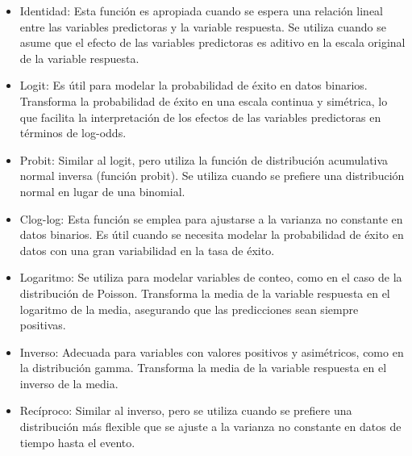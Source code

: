 \documentclass[
  11pt,
  bookmarksnumbered]{article}
\begin{document}
\begin{itemize}
\item
  Identidad: Esta función es apropiada cuando se espera una relación lineal entre las variables predictoras y la variable respuesta.
  Se utiliza cuando se asume que el efecto de las variables predictoras es aditivo en la escala original de la variable respuesta.
\item
  Logit: Es útil para modelar la probabilidad de éxito en datos binarios.
  Transforma la probabilidad de éxito en una escala continua y simétrica, lo que facilita la interpretación de los efectos de las variables predictoras en términos de log-odds.
\item
  Probit: Similar al logit, pero utiliza la función de distribución acumulativa normal inversa (función probit).
  Se utiliza cuando se prefiere una distribución normal en lugar de una binomial.
\item
  Clog-log: Esta función se emplea para ajustarse a la varianza no constante en datos binarios.
  Es útil cuando se necesita modelar la probabilidad de éxito en datos con una gran variabilidad en la tasa de éxito.
\item
  Logaritmo: Se utiliza para modelar variables de conteo, como en el caso de la distribución de Poisson.
  Transforma la media de la variable respuesta en el logaritmo de la media, asegurando que las predicciones sean siempre positivas.
\item
  Inverso: Adecuada para variables con valores positivos y asimétricos, como en la distribución gamma.
  Transforma la media de la variable respuesta en el inverso de la media.
\item
  Recíproco: Similar al inverso, pero se utiliza cuando se prefiere una distribución más flexible que se ajuste a la varianza no constante en datos de tiempo hasta el evento.
\end{itemize}
\end{document}
